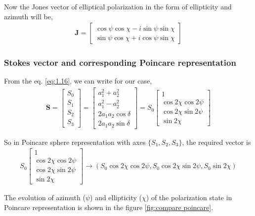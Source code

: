 \documentclass[11pt,a4paper]{article}
\numberwithin{equation}{section}
\begin{document}
Now the Jones vector of elliptical polarization in the form of ellipticity and azimuth will be,
\begin{align}
	\boldsymbol{J}= 
		\begin{bmatrix}
			\cos\psi\cos\chi- i \sin\psi\sin\chi \\
			\sin\psi\cos\chi+ i \cos\psi\sin\chi
		\end{bmatrix}
\end{align}

\subsubsection{Stokes vector and corresponding Poincare representation}
From the eq. \ref{eq:1.16}, we can write for our case, 
\begin{align}
	\boldsymbol{S}= \begin{bmatrix} S_0\\ S_1\\ S_2\\S_3\end{bmatrix} =
	\begin{bmatrix}
		{a_1^2 + a_2^2}\\
		{a_1^2 - a_2^2}\\
		{2a_1a_2\cos\delta}\\
		{2a_1a_2\sin\delta}
	\end{bmatrix}=S_0
	\begin{bmatrix}
		1\\
		\cos 2\chi \cos 2\psi\\
		\cos 2\chi \sin 2\psi\\
		\sin 2\chi
	\end{bmatrix}
\end{align}

So in Poincare sphere representation with axes $\{S_1, S_2, S_3\}$, the required vector is
\begin{align}
	S_0
	\begin{bmatrix}
		1\\
		\cos 2\chi \cos 2\psi\\
		\cos 2\chi \sin 2\psi\\
		\sin 2\chi
	\end{bmatrix}\longrightarrow
	(S_0\cos 2\chi \cos 2\psi, S_0\cos 2\chi \sin 2\psi, S_0\sin 2\chi)
\end{align}

The evolution of azimuth ($\psi$) and ellipticity ($\chi$) of the polarization state in Poincare representation is shown in the figure \ref{fig:compare poincare}.
\end{document}
